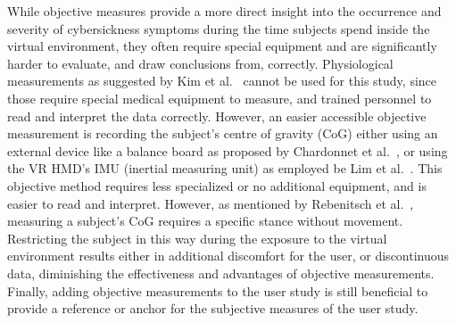 While objective measures provide a more direct insight into the occurrence and severity of cybersickness symptoms
during the time subjects spend inside the virtual environment, they often require special equipment and are
significantly harder to evaluate, and draw conclusions from, correctly.
Physiological measurements as suggested by Kim et al.~\cite{Kim2005} cannot be used for this study, since those
require special medical equipment to measure, and trained personnel to read and interpret the data correctly.
However, an easier accessible objective measurement is recording the subject's centre of gravity (CoG) either using an
external device like a balance board as proposed by Chardonnet et al.~\cite{Chardonnet2015}, or using the VR HMD's
IMU (inertial measuring unit) as employed be Lim et al.~\cite{Lim2020}.
This objective method requires less specialized or no additional equipment, and is easier to read and interpret.
However, as mentioned by Rebenitsch et al.~\cite{Rebenitsch2016}, measuring a subject's CoG requires a specific
stance without movement.
Restricting the subject in this way during the exposure to the virtual environment results either in additional
discomfort for the user, or discontinuous data, diminishing the effectiveness and advantages of objective measurements.
Finally, adding objective measurements to the user study is still beneficial to provide a reference or anchor for the
subjective measures of the user study.

